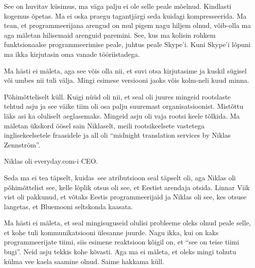 See on huvitav küsimus, ma väga palju ei ole selle peale mõelnud. Kindlasti  
kogemus õpetas. Ma ei oska praegu  tagantjärgi seda kuidagi kompresseerida. Ma 
tean, et programmeerijana arengud on mul pigem nagu hiljem olnud, võib-olla ma 
aga mäletan hilisemaid arenguid paremini. See, kus ma kolisin rohkem 
funktsionaalse programmeerimise peale,  juhtus peale Skype'i. Kuni Skype'i 
lõpuni ma ikka kirjutasin oma vanade tööriistadega.


Ma hästi ei mäleta, aga see võis olla nii, et  suvi otsa kirjutasime ja kuskil 
sügisel või umbes nii tuli välja. Mingi esimese versiooni jaoks võis kolm-neli 
kuud minna.


Põhimõtteliselt küll. Kuigi nüüd oli nii, et seal oli juures mingeid rootslaste 
tehtud asju ja see väike tiim oli osa  palju suuremast organisatsioonist. 
Mistõttu läks asi ka oluliselt aeglasemaks. Mingeid asju oli vaja rootsi keele 
tõlkida. Ma mäletan ükskord öösel sain Niklaselt, meili 
rootsikeelsete vastetega inglisekeelsetele fraasidele ja all oli 
\enquote{midnight translation services by Niklas Zennström}.


Niklas oli everyday.com-i CEO. 


Seda ma ei tea täpselt, kuidas see atributsioon seal täpselt  oli, aga Niklas 
oli põhimõttelist see, kelle lõplik otsus oli see, et Eestist arendaja otsida. 
Linnar Viik vist oli pakkunud, et võtaks Eestis 
programmeerijaid ja Niklas oli see, kes otsuse langetas, et Bluemooni 
seltskonda kaasata.


Ma hästi ei mäleta, et seal mingisuguseid olulisi probleeme oleks olnud peale 
selle, et kohe tuli  kommunikatsiooni ülesanne juurde. Nagu ikka, kui on kaks 
programmeerijate tiimi, siis esimene reaktsioon kõigil on, et \enquote{see on 
teise tiimi bugi}. Neid asju  tekkis kohe kõvasti. Aga ma ei mäleta, et oleks 
mingi tohutu külma vee kaela saamine olnud. Saime hakkama küll. 

